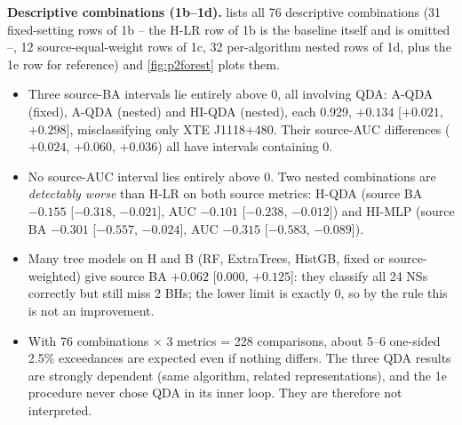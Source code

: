 \textbf{Descriptive combinations (1b--1d).} \Descriptive{}  lists all 76 descriptive combinations
(31 fixed-setting rows of 1b -- the H-LR row of 1b is the baseline itself and is omitted --, 12 source-equal-weight rows
of 1c, 32 per-algorithm nested rows of 1d, plus the 1e row for reference) and \cref{fig:p2forest} plots them.
\begin{itemize}
\item Three source-BA intervals lie entirely above 0, all involving QDA: A-QDA (fixed), A-QDA (nested) and HI-QDA
(nested), each 0.929, $+0.134$ [$+0.021$, $+0.298$], misclassifying only XTE J1118+480. Their source-AUC differences
($+0.024$, $+0.060$, $+0.036$) all have intervals containing 0.
\item No source-AUC interval lies entirely above 0. Two nested combinations are \emph{detectably worse} than H-LR on both
source metrics: H-QDA (source BA $-0.155$ [$-0.318$, $-0.021$], AUC $-0.101$ [$-0.238$, $-0.012$]) and HI-MLP (source BA
$-0.301$ [$-0.557$, $-0.024$], AUC $-0.315$ [$-0.583$, $-0.089$]).
\item Many tree models on H and B (RF, ExtraTrees, HistGB, fixed or source-weighted) give source BA $+0.062$ [0.000, $+0.125$]:
they classify all 24 NSs correctly but still miss 2 BHs; the lower limit is exactly 0, so by the rule this is not an
improvement.
\item With 76 combinations $\times$ 3 metrics = 228 comparisons, about 5--6 one-sided 2.5\% exceedances are expected even if
nothing differs. The three QDA results are strongly dependent (same algorithm, related representations), and the 1e
procedure never chose QDA in its inner loop. They are therefore not interpreted.
\end{itemize}

